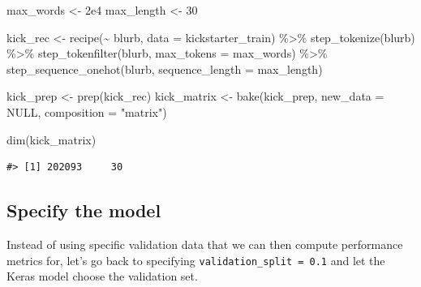 \documentclass[
]{krantz}
\makeatletter
\newenvironment{Shaded}{\begin{snugshade}}{\end{snugshade}}
\newcommand{\AttributeTok}[1]{\textcolor[rgb]{0.77,0.63,0.00}{#1}}
\newcommand{\ConstantTok}[1]{\textcolor[rgb]{0.00,0.00,0.00}{#1}}
\newcommand{\DecValTok}[1]{\textcolor[rgb]{0.00,0.00,0.81}{#1}}
\newcommand{\FloatTok}[1]{\textcolor[rgb]{0.00,0.00,0.81}{#1}}
\newcommand{\FunctionTok}[1]{\textcolor[rgb]{0.00,0.00,0.00}{#1}}
\newcommand{\NormalTok}[1]{#1}
\newcommand{\OtherTok}[1]{\textcolor[rgb]{0.56,0.35,0.01}{#1}}
\newcommand{\SpecialCharTok}[1]{\textcolor[rgb]{0.00,0.00,0.00}{#1}}
\newcommand{\StringTok}[1]{\textcolor[rgb]{0.31,0.60,0.02}{#1}}
\newenvironment{kframe}{%
\medskip{}
\setlength{\fboxsep}{.8em}
 \def\at@end@of@kframe{}%
 \ifinner\ifhmode%
  \def\at@end@of@kframe{\end{minipage}}%
  \begin{minipage}{\columnwidth}%
 \fi\fi%
 \def\FrameCommand##1{\hskip\@totalleftmargin \hskip-\fboxsep
 \colorbox{shadecolor}{##1}\hskip-\fboxsep
     \hskip-\linewidth \hskip-\@totalleftmargin \hskip\columnwidth}%
 \MakeFramed {\advance\hsize-\width
   \@totalleftmargin\z@ \linewidth\hsize
   \@setminipage}}%
 {\par\unskip\endMakeFramed%
 \at@end@of@kframe}
\renewenvironment{Shaded}{\begin{kframe}}{\end{kframe}}
\makeatother
\begin{document}
\begin{Shaded}
\begin{Highlighting}[]
\NormalTok{max\_words }\OtherTok{\textless{}{-}} \FloatTok{2e4}
\NormalTok{max\_length }\OtherTok{\textless{}{-}} \DecValTok{30}

\NormalTok{kick\_rec }\OtherTok{\textless{}{-}} \FunctionTok{recipe}\NormalTok{(}\SpecialCharTok{\textasciitilde{}}\NormalTok{ blurb, }\AttributeTok{data =}\NormalTok{ kickstarter\_train) }\SpecialCharTok{\%\textgreater{}\%}
  \FunctionTok{step\_tokenize}\NormalTok{(blurb) }\SpecialCharTok{\%\textgreater{}\%}
  \FunctionTok{step\_tokenfilter}\NormalTok{(blurb, }\AttributeTok{max\_tokens =}\NormalTok{ max\_words) }\SpecialCharTok{\%\textgreater{}\%}
  \FunctionTok{step\_sequence\_onehot}\NormalTok{(blurb, }\AttributeTok{sequence\_length =}\NormalTok{ max\_length)}

\NormalTok{kick\_prep }\OtherTok{\textless{}{-}} \FunctionTok{prep}\NormalTok{(kick\_rec)}
\NormalTok{kick\_matrix }\OtherTok{\textless{}{-}} \FunctionTok{bake}\NormalTok{(kick\_prep, }\AttributeTok{new\_data =} \ConstantTok{NULL}\NormalTok{, }\AttributeTok{composition =} \StringTok{"matrix"}\NormalTok{)}

\FunctionTok{dim}\NormalTok{(kick\_matrix)}
\end{Highlighting}
\end{Shaded}

\begin{verbatim}
#> [1] 202093     30
\end{verbatim}

\hypertarget{cnnfullmodel}{%
\subsection{Specify the model}\label{cnnfullmodel}}

Instead of using specific validation data that we can then compute performance metrics for, let's go back to specifying \texttt{validation\_split\ =\ 0.1} and let the Keras model choose the validation set.
\end{document}
